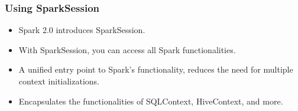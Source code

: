 %
%
%
%
%
%
%
\begin{frame}
    \frametitle{Using SparkSession}
    \begin{itemize}
        \item Spark 2.0 introduces SparkSession.
        \item With SparkSession, you can access all Spark functionalities.
        \item A unified entry point to Spark's functionality, reduces the need for multiple context initializations.
        \item Encapsulates the functionalities of SQLContext, HiveContext, and more.
    \end{itemize}
\end{frame}
%

